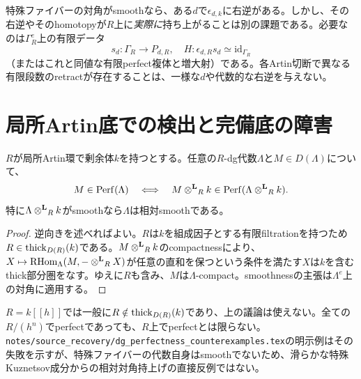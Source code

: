\begin{remark}[有限段階の選択は解決ではない]\label{rem:lifting}
特殊ファイバーの対角がsmoothなら、ある$d$で$\epsilon_{d,k}$に右逆がある。しかし、その右逆やそのhomotopyが$R$上に\emph{実際に}持ち上がることは別の課題である。必要なのは$\Gamma_R^e$上の有限データ
\[
 s_d:\Gamma_R\longrightarrow P_{d,R},\quad
 H:\epsilon_{d,R}s_d\simeq\mathrm{id}_{\Gamma_R}
\]
（またはこれと同値な有限perfect複体と増大射）である。各Artin切断で異なる有限段数のretractが存在することは、一様な$d$や代数的な右逆を与えない。
\end{remark}

\section{局所Artin底での検出と完備底の障害}
\begin{lemma}[Artin底でのperfectness検出]\label{lem:artin}
$R$が局所Artin環で剰余体$k$を持つとする。任意の$R$-dg代数$\Lambda$と$M\in D(\Lambda)$について、
\[
 M\in\operatorname{Perf}(\Lambda)
 \quad\Longleftrightarrow\quad
 M\mathbin{\otimes^{\mathbf L}}_Rk\in\operatorname{Perf}(\Lambda\mathbin{\otimes^{\mathbf L}}_Rk).
\]
特に$\Lambda\mathbin{\otimes^{\mathbf L}}_Rk$がsmoothなら$\Lambda$は相対smoothである。
\end{lemma}
\begin{proof}
逆向きを述べればよい。$R$は$k$を組成因子とする有限filtrationを持つため$R\in\operatorname{thick}_{D(R)}(k)$である。$M\mathbin{\otimes^{\mathbf L}}_Rk$のcompactnessにより、$X\mapsto\operatorname{RHom}_\Lambda(M,-\mathbin{\otimes^{\mathbf L}}_RX)$が任意の直和を保つという条件を満たす$X$は$k$を含むthick部分圏をなす。ゆえに$R$も含み、$M$は$\Lambda$-compact。smoothnessの主張は$\Lambda^e$上の対角に適用する。
\end{proof}

\begin{remark}[完備底への誤った外挿]
$R=k[[h]]$では一般に$R\notin\operatorname{thick}_{D(R)}(k)$であり、上の議論は使えない。全ての$R/(h^n)$でperfectであっても、$R$上でperfectとは限らない。\texttt{notes/source\_recovery/dg\_perfectness\_counterexamples.tex}の明示例はその失敗を示すが、特殊ファイバーの代数自身はsmoothでないため、滑らかな特殊Kuznetsov成分からの相対対角持上げの直接反例ではない。
\end{remark}

